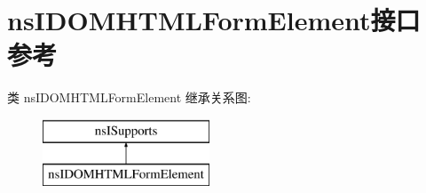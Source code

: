 \hypertarget{interfacens_i_d_o_m_h_t_m_l_form_element}{}\section{ns\+I\+D\+O\+M\+H\+T\+M\+L\+Form\+Element接口 参考}
\label{interfacens_i_d_o_m_h_t_m_l_form_element}
类 ns\+I\+D\+O\+M\+H\+T\+M\+L\+Form\+Element 继承关系图\+:\begin{figure}[H]
\begin{center}
\leavevmode
\includegraphics[height=2.000000cm]{interfacens_i_d_o_m_h_t_m_l_form_element}
\end{center}
\end{figure}
